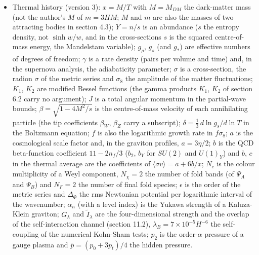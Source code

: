 \documentclass[
  10pt,
]{article}
\begin{document}
\begin{itemize}
  four-dimensional coupling strengths (\(G_N\) and \(G_F\) are Newton's
  and Fermi's constants, \(G(k)\) the Einstein-Hilbert coefficient);
  \(\tilde I_{of}\) and \(\tilde I^{(b)}_{of}\) are overlap integrals of
  a dirac16complex orbital \(o\) with a Standard-Model zero mode \(f\);
  \(q_f\) is a \(B - L\) charge; \(P_a = (1 + \gamma^{x_0})/2\) and
  \(P_b = (1 - \gamma^{x_0})/2\) are the \(x_0\)-chiral projectors (not
  the four-dimensional chiral projector \(P_+ = (1 + \Gamma_4)/2\));
  \(J^B_M\) is the baryon-number current.
\item
  Thermal history (version 3): \(x = M/T\) with \(M = M_{DM}\) the
  dark-matter mass (not the author's \(M\) of \(m = 3HM\); \(M\) and
  \(m\) are also the masses of two attracting bodies in section 4.3);
  \(Y = n/s\) is an abundance (\(s\) the entropy density, not
  \(\sinh w/w\), and in the cross-sections \(s\) is the squared
  centre-of-mass energy, the Mandelstam variable); \(g_\rho\), \(g_s\)
  (and \(g_*\)) are effective numbers of degrees of freedom; \(\gamma\)
  is a rate density (pairs per volume and time) and, in the supernova
  analysis, the adiabaticity parameter; \(\sigma\) is a cross-section,
  the radion \(\sigma\) of the metric series and \(\sigma_8\) the
  amplitude of the matter fluctuations; \(K_1\), \(K_2\) are modified
  Bessel functions (the gamma products \(K_1\), \(K_2\) of section 6.2
  carry no argument); \(J\) is a total angular momentum in the
  partial-wave bounds; \(\beta = \sqrt{1 - 4M^2/s}\) is the
  centre-of-mass velocity of each annihilating particle (the tip
  coefficients \(\beta_W\), \(\beta_Z\) carry a subscript);
  \(\delta = \frac13\,d\ln g_s/d\ln T\) in the Boltzmann equation; \(f\)
  is also the logarithmic growth rate in \(f\sigma_8\); \(a\) is the
  cosmological scale factor and, in the graviton profiles,
  \(a = 3\eta/2\); \(b\) is the QCD beta-function coefficient
  \(11 - 2n_f/3\) (\(b_2\), \(b_Y\) for \(SU(2)\) and \(U(1)_Y\)) and
  \(b\), \(c\) in the thermal average are the coefficients of
  \(\langle\sigma v\rangle = a + 6b/x\); \(N_c\) is the colour
  multiplicity of a Weyl component, \(N_\chi = 2\) the number of fold
  bands (of \(\Psi_A\) and \(\Psi_B\)) and \(N_F = 2\) the number of
  final fold species; \(\epsilon\) is the order of the metric series and
  \(\Delta_\Phi\) the rms Newtonian potential per logarithmic interval
  of the wavenumber; \(\alpha_n\) (with a level index) is the Yukawa
  strength of a Kaluza-Klein graviton; \(G_\lambda\) and
  \(\tilde I_\lambda\) are the four-dimensional strength and the overlap
  of the self-interaction channel (section 11.2),
  \(\lambda_B = 7\times10^{-5}H^{-6}\) the self-coupling of the
  numerical Kohn-Sham tests; \(p_2\) is the order-\(\alpha\) pressure of
  a gauge plasma and \(\bar p = (p_0 + 3p_t)/4\) the hidden pressure.
\end{itemize}
\end{document}
